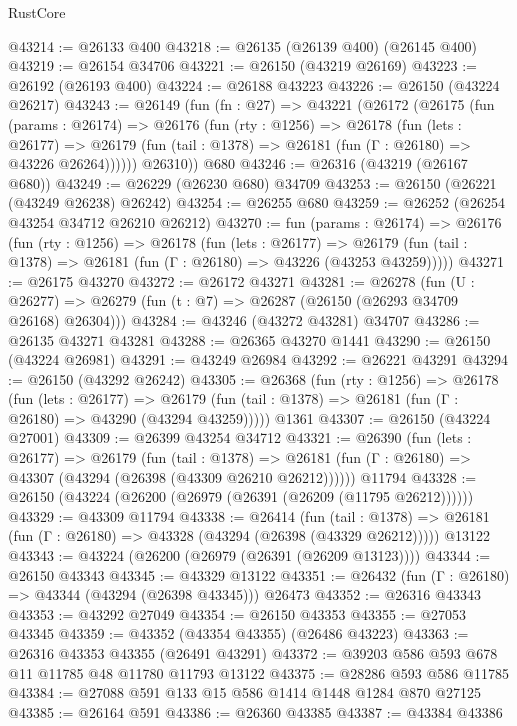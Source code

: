 \begin{lexlean}{RustCore}
\begin{coremodule}
@43214 := @26133 @400
@43218 := @26135 (@26139 @400) (@26145 @400)
@43219 := @26154 @34706
@43221 := @26150 (@43219 @26169)
@43223 := @26192 (@26193 @400)
@43224 := @26188 @43223
@43226 := @26150 (@43224 @26217)
@43243 := @26149
    (fun (fn : @27) =>
    @43221
      (@26172
        (@26175
          (fun (params : @26174) =>
          @26176
            (fun (rty : @1256) =>
            @26178
              (fun (lets : @26177) =>
              @26179 (fun (tail : @1378) => @26181 (fun (Γ : @26180) => @43226 @26264))))))
        @26310))
    @680
@43246 := @26316 (@43219 (@26167 @680))
@43249 := @26229 (@26230 @680) @34709
@43253 := @26150 (@26221 (@43249 @26238) @26242)
@43254 := @26255 @680
@43259 := @26252 (@26254 @43254 @34712 @26210 @26212)
@43270 := fun (params : @26174) =>
  @26176
    (fun (rty : @1256) =>
    @26178
      (fun (lets : @26177) =>
      @26179 (fun (tail : @1378) => @26181 (fun (Γ : @26180) => @43226 (@43253 @43259)))))
@43271 := @26175 @43270
@43272 := @26172 @43271
@43281 := @26278
    (fun (U : @26277) => @26279 (fun (t : @7) => @26287 (@26150 (@26293 @34709 @26168) @26304)))
@43284 := @43246 (@43272 @43281) @34707
@43286 := @26135 @43271 @43281
@43288 := @26365 @43270 @1441
@43290 := @26150 (@43224 @26981)
@43291 := @43249 @26984
@43292 := @26221 @43291
@43294 := @26150 (@43292 @26242)
@43305 := @26368
    (fun (rty : @1256) =>
    @26178
      (fun (lets : @26177) =>
      @26179 (fun (tail : @1378) => @26181 (fun (Γ : @26180) => @43290 (@43294 @43259)))))
    @1361
@43307 := @26150 (@43224 @27001)
@43309 := @26399 @43254 @34712
@43321 := @26390
    (fun (lets : @26177) =>
    @26179
      (fun (tail : @1378) =>
      @26181 (fun (Γ : @26180) => @43307 (@43294 (@26398 (@43309 @26210 @26212))))))
    @11794
@43328 := @26150 (@43224 (@26200 (@26979 (@26391 (@26209 (@11795 @26212))))))
@43329 := @43309 @11794
@43338 := @26414
    (fun (tail : @1378) => @26181 (fun (Γ : @26180) => @43328 (@43294 (@26398 (@43329 @26212)))))
    @13122
@43343 := @43224 (@26200 (@26979 (@26391 (@26209 @13123))))
@43344 := @26150 @43343
@43345 := @43329 @13122
@43351 := @26432 (fun (Γ : @26180) => @43344 (@43294 (@26398 @43345))) @26473
@43352 := @26316 @43343
@43353 := @43292 @27049
@43354 := @26150 @43353
@43355 := @27053 @43345
@43359 := @43352 (@43354 @43355) (@26486 @43223)
@43363 := @26316 @43353 @43355 (@26491 @43291)
@43372 := @39203 @586 @593 @678 @11 @11785 @48 @11780 @11793 @13122
@43375 := @28286 @593 @586 @11785
@43384 := @27088 @591 @133 @15 @586 @1414 @1448 @1284 @870 @27125
@43385 := @26164 @591
@43386 := @26360 @43385
@43387 := @43384 @43386

\end{coremodule}
\end{lexlean}
